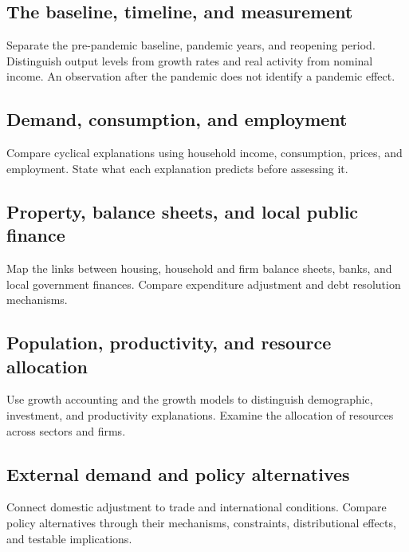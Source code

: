 \label{sec:china}

\subsection{The baseline, timeline, and measurement}
Separate the pre-pandemic baseline, pandemic years, and reopening period.
Distinguish output levels from growth rates and real activity from nominal
income. An observation after the pandemic does not identify a pandemic effect.

\subsection{Demand, consumption, and employment}
Compare cyclical explanations using household income, consumption, prices,
and employment. State what each explanation predicts before assessing it.

\subsection{Property, balance sheets, and local public finance}
Map the links between housing, household and firm balance sheets, banks,
and local government finances. Compare expenditure adjustment and debt
resolution mechanisms.

\subsection{Population, productivity, and resource allocation}
Use growth accounting and the growth models to distinguish demographic,
investment, and productivity explanations. Examine the allocation of resources
across sectors and firms.

\subsection{External demand and policy alternatives}
Connect domestic adjustment to trade and international conditions.
Compare policy alternatives through their mechanisms, constraints, distributional
effects, and testable implications.
